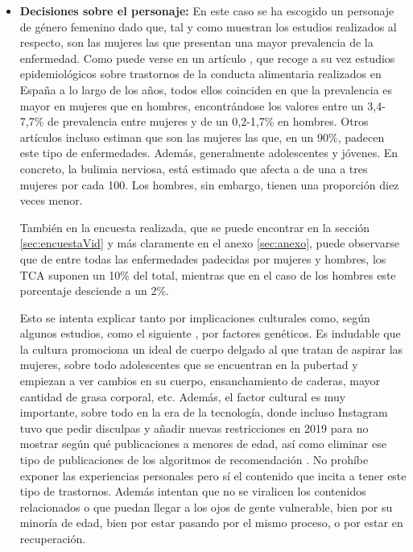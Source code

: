 \documentclass[12pt, a4paper,twoside,titlepage]{book}
\begin{document}
\begin{itemize}
      \item {\textbf{Decisiones sobre el personaje:}
     En este caso se ha escogido un personaje de género femenino dado que, tal y como muestran los estudios realizados al respecto, son las mujeres las que presentan una mayor prevalencia de la enfermedad. Como puede verse en un artículo \cite{articuloTCA}, que recoge a su vez estudios epidemiológicos sobre trastornos de la conducta alimentaria realizados en España a lo largo de los años, todos ellos coinciden en que la prevalencia es mayor en mujeres que en hombres, encontrándose los valores entre un 3,4-7,7\% de prevalencia entre mujeres y de un 0,2-1,7\% en hombres. Otros artículos \cite{articuloTCA2} incluso estiman que son las mujeres las que, en un 90\%, padecen este tipo de enfermedades. Además, generalmente adolescentes y jóvenes. En concreto, la bulimia nerviosa, está estimado que afecta a de una a tres mujeres por cada 100. Los hombres, sin embargo, tienen una proporción diez veces menor. 
     
     También en la encuesta realizada, que se puede encontrar en la sección \ref{sec:encuestaVid} y más claramente en el anexo \ref{sec:anexo}, puede observarse que de entre todas las enfermedades padecidas por mujeres y hombres, los TCA suponen un 10\% del total, mientras que en el caso de los hombres este porcentaje desciende a un 2\%. 
     
    Esto se intenta explicar tanto por implicaciones culturales como, según algunos estudios, como el siguiente \cite{articuloTCA3}, por factores genéticos. Es indudable que la cultura promociona un ideal de cuerpo delgado al que tratan de aspirar las mujeres, sobre todo adolescentes que se encuentran en la pubertad y empiezan a ver cambios en su cuerpo, ensanchamiento de caderas, mayor cantidad de grasa corporal, etc. Además, el factor cultural es muy importante, sobre todo en la era de la tecnología, donde incluso Instagram tuvo que pedir disculpas y añadir nuevas restricciones en 2019 para no mostrar según qué publicaciones a menores de edad, así como eliminar ese tipo de publicaciones de los algoritmos de recomendación \cite{articuloTCA4}. No prohíbe exponer las experiencias personales pero sí el contenido que incita a tener este tipo de trastornos. Además intentan que no se viralicen los contenidos relacionados o que puedan llegar a los ojos de gente vulnerable, bien por su minoría de edad, bien por estar pasando por el mismo proceso, o por estar en recuperación. 
    
}
\end{itemize}
\end{document}
